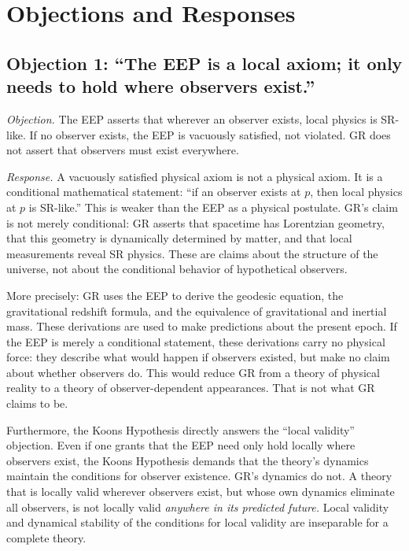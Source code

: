 \documentclass[11pt,a4paper]{article}
\begin{document}
\section{Objections and Responses}
\label{sec:objections}

\subsection{Objection 1: ``The EEP is a local axiom; it only needs to hold where observers exist.''}

\emph{Objection.} The EEP asserts that wherever an observer exists, local physics is
SR-like. If no observer exists, the EEP is vacuously satisfied, not violated. GR does
not assert that observers must exist everywhere.

\emph{Response.} A vacuously satisfied physical axiom is not a physical axiom. It is a
conditional mathematical statement: ``if an observer exists at $p$, then local physics
at $p$ is SR-like.'' This is weaker than the EEP as a physical postulate. GR's claim
is not merely conditional: GR asserts that spacetime has Lorentzian geometry, that
this geometry is dynamically determined by matter, and that local measurements reveal
SR physics. These are claims about the structure of the universe, not about the
conditional behavior of hypothetical observers.

More precisely: GR uses the EEP to derive the geodesic equation, the gravitational
redshift formula, and the equivalence of gravitational and inertial mass. These
derivations are used to make predictions about the present epoch. If the EEP is merely
a conditional statement, these derivations carry no physical force: they describe what
would happen if observers existed, but make no claim about whether observers do. This
would reduce GR from a theory of physical reality to a theory of observer-dependent
appearances. That is not what GR claims to be.

Furthermore, the Koons Hypothesis directly answers the ``local validity'' objection.
Even if one grants that the EEP need only hold locally where observers exist, the Koons
Hypothesis demands that the theory's dynamics maintain the conditions for observer
existence. GR's dynamics do not. A theory that is locally valid wherever observers
exist, but whose own dynamics eliminate all observers, is not locally valid
\emph{anywhere in its predicted future.} Local validity and dynamical stability of the
conditions for local validity are inseparable for a complete theory.
\end{document}
